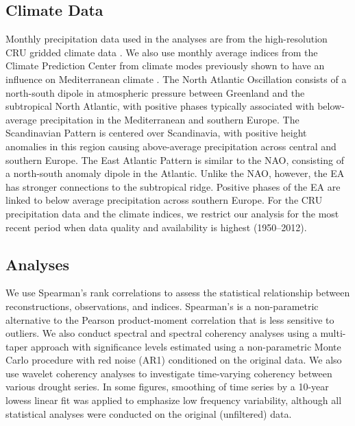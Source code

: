 \documentclass[draft,jgr]{AGUTeX}
\begin{document}
\begin{article}
\subsection{Climate Data}
\noindent Monthly precipitation data used in the analyses are from the high-resolution CRU gridded climate data \citep[TS3.21,][]{Harris2014}. We also use monthly average indices from the Climate Prediction Center from climate modes previously shown to have an influence on Mediterranean climate \citep{Sousa2011}. The North Atlantic Oscillation \citep[NAO;][]{Hurrell1995} consists of a north-south dipole in atmospheric pressure between Greenland and the subtropical North Atlantic, with positive phases typically associated with below-average precipitation in the Mediterranean and southern Europe. The Scandinavian Pattern \citep[SCA;][]{Bueh2007} is centered over Scandinavia, with positive height anomalies in this region causing above-average precipitation across central and southern Europe. The East Atlantic Pattern \citep[EA;][]{Barnston1987} is similar to the NAO, consisting of a north-south anomaly dipole in the Atlantic. Unlike the NAO, however, the EA has stronger connections to the subtropical ridge. Positive phases of the EA are linked to below average precipitation across southern Europe. For the CRU precipitation data and the climate indices, we restrict our analysis for the most recent period when data quality and availability is highest (1950--2012).

\subsection{Analyses}
\noindent We use Spearman's rank correlations to assess the statistical relationship between reconstructions, observations, and indices.  Spearman's is a non-parametric alternative to the Pearson product-moment correlation that is less sensitive to outliers. We also conduct spectral and spectral coherency analyses using a multi-taper approach \citep{Thomson:1982,Chave:etal1987,Mann:Lees1996,Czaja:Marshall2001,Huybers:2004} with significance levels estimated using a non-parametric Monte Carlo procedure with red noise (AR1) conditioned on the original data. We also use wavelet coherency analyses \citep{Marauan2004,Maraun2007} to investigate time-varying coherency between various drought series. In some figures, smoothing of time series by a 10-year lowess linear fit was applied to emphasize low frequency variability, although all statistical analyses were conducted on the original (unfiltered) data.


\end{article}
\end{document}
